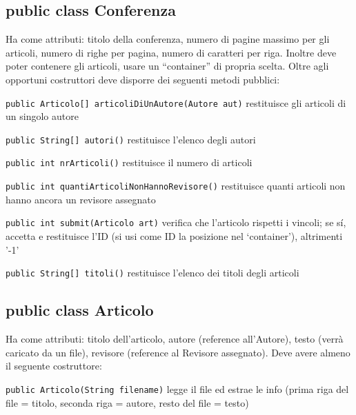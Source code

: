 \documentclass[a4paper]{article}
\begin{document}
\subsection*{public class Conferenza}

Ha come attributi: titolo della conferenza, numero di pagine massimo per gli 
articoli, numero di righe per pagina, numero di caratteri per riga.
Inoltre deve poter contenere gli articoli, usare un ``container'' di propria 
scelta.
Oltre agli opportuni costruttori deve disporre dei seguenti metodi pubblici:

\begin{compactitem}


\item\texttt{public Articolo[] articoliDiUnAutore(Autore aut)}
restituisce gli articoli di un singolo autore

\item\texttt{public String[] autori()}
restituisce l'elenco degli autori


\item\texttt{public int 	nrArticoli()}
restituisce il numero di articoli

\item\texttt{public int quantiArticoliNonHannoRevisore()}
restituisce quanti articoli non hanno ancora un revisore assegnato

\item\texttt{public int submit(Articolo art)}
verifica che l'articolo rispetti i vincoli; se s\'i, accetta e restituisce l'ID (si usi come ID la posizione nel `container'), 
altrimenti '-1'


\item\texttt{public String[] titoli()}
restituisce l'elenco dei titoli degli articoli



\end{compactitem}


\subsection*{public class Articolo}

Ha come attributi: titolo dell'articolo, autore (reference all'Autore), testo 
(verrà caricato da un file), revisore (reference al Revisore assegnato).
Deve avere almeno il seguente costruttore:

\begin{compactitem} 


\item \texttt{public Articolo(String filename)}
legge il file ed estrae le info (prima riga del file = titolo,  seconda 
riga = autore, resto del file = testo)


\end{compactitem} 
\end{document}
